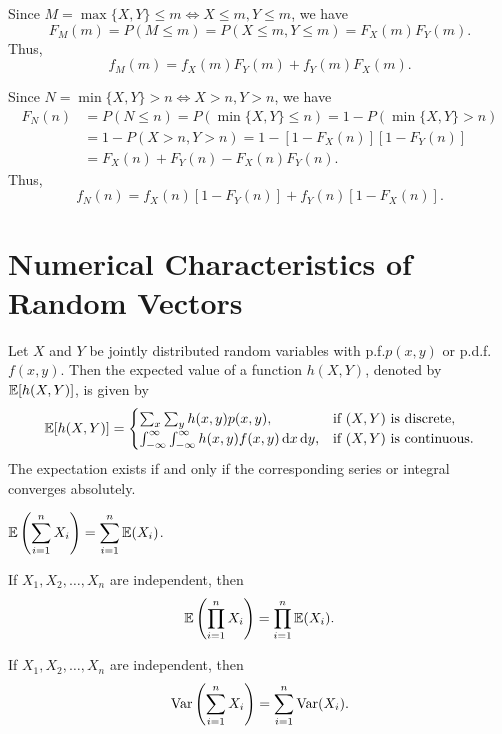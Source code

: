 Since \(M = \max\{X, Y\} \leq m \Leftrightarrow X \leq m, Y \leq m\), we have
\[
  F_{M}(m) = P(M \leq m) = P(X \leq m, Y \leq m) = F_X(m) F_Y(m).
\]
Thus,
\[
  f_{M}(m) = f_X(m) F_Y(m) + f_Y(m) F_X(m).
\]

Since \(N = \min\{X, Y\} > n \Leftrightarrow X > n, Y > n\), we have
\begin{align*}
  F_{N}(n) &= P(N \leq n) = P(\min\{X, Y\} \leq n) = 1 - P(\min\{X, Y\} > n) \\
  &= 1 - P(X > n, Y > n) = 1 - [1 - F_X(n)][1 - F_Y(n)] \\
  &= F_X(n) + F_Y(n) - F_X(n) F_Y(n).
\end{align*}
Thus,
\[
  f_{N}(n) = f_X(n) [1 - F_Y(n)] + f_Y(n) [1 - F_X(n)].
\]

\section{Numerical Characteristics of Random Vectors}

\begin{theorem}
  Let \(X\) and \(Y\) be jointly distributed random variables with p.f.\@ \(p(x, y)\) or p.d.f.\@ \(f(x, y)\). Then the expected value of a function \(h(X, Y)\), denoted by \(\mathbb{E}[h(X, Y)]\), is given by
  \[
    \mathbb{E}[h(X, Y)] = \begin{cases}
      \sum_{x} \sum_{y} h(x, y) p(x, y), & \text{if } (X, Y) \text{ is discrete}, \\
      \int_{-\infty}^\infty \int_{-\infty}^\infty h(x, y) f(x, y) \, \mathrm{d} x \, \mathrm{d} y, & \text{if } (X, Y) \text{ is continuous}.
    \end{cases}
  \]
  The expectation exists if and only if the corresponding series or integral converges absolutely.
\end{theorem}

\begin{proposition}
  \(\displaystyle \mathbb{E} \left(\sum_{i=1}^n X_i\right) = \sum_{i=1}^n \mathbb{E}(X_i)\).
\end{proposition}

\begin{proposition}
  If \(X_1, X_2, \dots, X_n\) are independent, then
  \[
    \mathbb{E} \left(\prod_{i=1}^n X_i\right) = \prod_{i=1}^n \mathbb{E}(X_i).
  \]
\end{proposition}

\begin{proposition}
  If \(X_1, X_2, \dots, X_n\) are independent, then
  \[
    \mathrm{Var} \left(\sum_{i=1}^n X_i\right) = \sum_{i=1}^n \mathrm{Var}(X_i).
  \]
\end{proposition}

